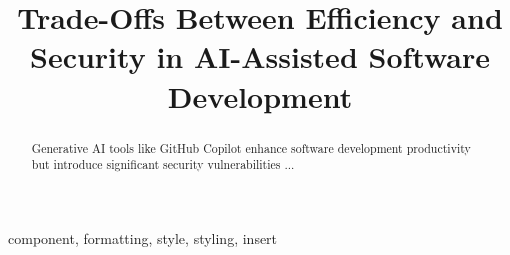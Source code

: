 \documentclass[conference]{IEEEtran}
\begin{document}
\title{Trade-Offs Between Efficiency and Security in AI-Assisted Software Development}

\author{
\and
{}
\and
{}
}

\maketitle

\begin{abstract}
Generative AI tools like GitHub Copilot enhance software development productivity but introduce significant security vulnerabilities ...
\end{abstract}

\begin{IEEEkeywords}
component, formatting, style, styling, insert
\end{IEEEkeywords}







\end{document}
